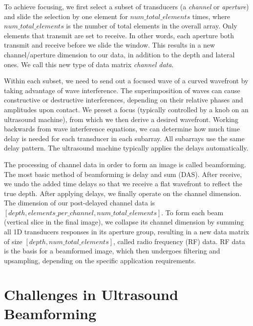  To achieve focusing, we first select a subset of transducers (a \textit{channel} or
 \textit{aperture}) and slide the selection by one element for $num\_total\_elements$ times, where $num\_total\_elements$ is the number of total elements in the overall array. Only elements that transmit are set to receive. In other words, each aperture both transmit and receive before we slide the window. This results in a new channel/aperture dimension to our data, in addition to the depth and lateral ones. We call this new type of data matrix \textit{channel data}. %

 Within each subset, we need to send out a focused wave of a curved wavefront by taking advantage of wave interference. The superimposition of waves can cause constructive or destructive interferences, depending on their relative phases and amplitudes upon contact. We preset a focus (typically controlled by a knob on an ultrasound machine), from which we then derive a desired wavefront. Working backwards from wave interference equations, we can determine how much time delay is needed for each transducer in each subarray. All subarrays use the same delay pattern. The ultrasound machine typically applies the delays automatically. %

 The processing of channel data in order to form an image is called beamforming. The most basic method of beamforming is delay and sum (DAS). After receive, we undo the added time delays so that we receive a flat wavefront to reflect the true depth. After applying delays, we finally operate on the channel dimension. The dimension of our post-delayed channel data is $[depth, elements\_per\_channel, num\_total\_elements]$. To form each beam (vertical slice in the final image), we collapse its channel dimension by summing all 1D transducers responses in its aperture group, resulting in a new data matrix of size $[depth, num\_total\_elements]$, called radio frequency (RF) data. RF data is the basis for a beamformed image, which then undergoes filtering and upsampling, depending on the specific application requirements. %


\section{Challenges in Ultrasound Beamforming}

